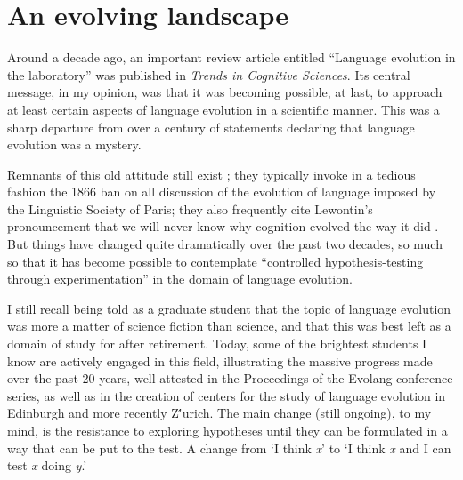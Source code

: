 \chapter{An evolving landscape}\label{chap2}

Around a decade ago, an important review article entitled ``Language evolution in the laboratory'' \citep{scott2010language} was published in \textit{Trends in Cognitive Sciences}. Its central message, in my opinion, was that it was becoming possible, at last, to approach at least certain aspects of language evolution in a scientific manner. This was a sharp departure from over a century of statements declaring that language evolution was a mystery.

Remnants of this old attitude still exist \citep{hauser2014mystery}; they typically invoke in a tedious fashion the 1866 ban on all discussion of the evolution of language imposed by the Linguistic Society of Paris; they also frequently cite Lewontin's pronouncement that we will never know why cognition evolved the way it did \citep{lewontin1998evolution}. But things have changed quite dramatically over the past two decades, so much so that it has become possible to contemplate ``controlled hypothesis-testing through experimentation'' \citep{motamedi2019evolving} in the domain of language evolution.

I still recall being told as a graduate student that the topic of language evolution was more a matter of science fiction than science, and that this was best left as a domain of study for after retirement. Today, some of the brightest students I know are actively engaged in this field, illustrating the massive progress made over the past 20 years, well attested in the Proceedings of the Evolang conference series, as well as in the creation of centers for the study of language evolution in Edinburgh and more recently Z\''{u}rich. The main change (still ongoing), to my mind, is the resistance to exploring hypotheses until they can be formulated in a way that can be put to the test. A change from `I think \textit{x}' to `I think \textit{x} and I can test \textit{x} doing \textit{y}.'

